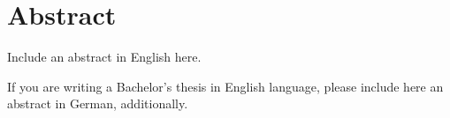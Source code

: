 \chapter*{Abstract}
Include an abstract in English here.

If you are writing a Bachelor's thesis in English language, please include here an abstract in German, additionally.
